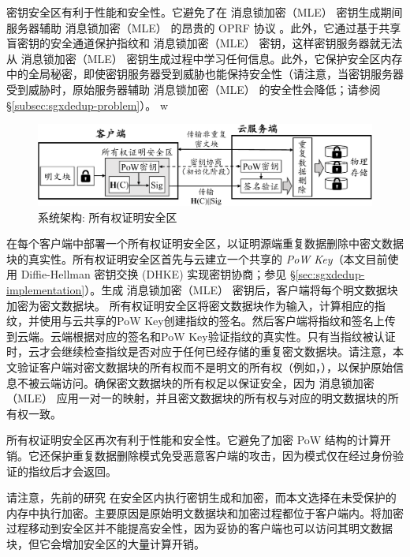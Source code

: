 密钥安全区有利于性能和安全性。它避免了在 消息锁加密（MLE） 密钥生成期间服务器辅助 消息锁加密（MLE） 的昂贵的 OPRF 协议 \cite{bellare2013DupLESS}。此外，它通过基于共享盲密钥的安全通道保护指纹和 消息锁加密（MLE） 密钥，这样密钥服务器就无法从 消息锁加密（MLE） 密钥生成过程中学习任何信息。此外，它保护安全区内存中的全局秘密，即使密钥服务器受到威胁也能保持安全性（请注意，当密钥服务器受到威胁时，原始服务器辅助 消息锁加密（MLE） 的安全性会降低；请参阅 \S\ref{subsec:sgxdedup-problem}）。
  w
\begin{figure}[!htb]
  \centering
  \includegraphics[width=\textwidth]{pic/sgxdedup/pow.pdf}
  \caption{\sysnameS 系统架构: 所有权证明安全区}
  \label{fig:sgxdedup-overview-pow}
  \vspace{-3pt}
\end{figure}

\sysnameS 在每个客户端中部署一个所有权证明安全区，以证明源端重复数据删除中密文数据块的真实性。所有权证明安全区首先与云建立一个共享的 \textit{PoW Key}（本文目前使用 Diffie-Hellman 密钥交换 (DHKE) 实现密钥协商；参见 \S\ref{sec:sgxdedup-implementation}）。生成 消息锁加密（MLE） 密钥后，客户端将每个明文数据块加密为密文数据块。 所有权证明安全区将密文数据块作为输入，计算相应的指纹，并使用与云共享的PoW Key创建指纹的签名。然后客户端将指纹和签名上传到云端。云端根据对应的签名和PoW Key验证指纹的真实性。只有当指纹被认证时，云才会继续检查指纹是否对应于任何已经存储的重复密文数据块。请注意，本文验证客户端对密文数据块的所有权而不是明文的所有权（例如，\cite{halevi11}），以保护原始信息不被云端访问。确保密文数据块的所有权足以保证安全，因为 消息锁加密（MLE） 应用一对一的映射，并且密文数据块的所有权与对应的明文数据块的所有权一致。

所有权证明安全区再次有利于性能和安全性。它避免了加密 PoW 结构的计算开销。它还保护重复数据删除模式免受恶意客户端的攻击，因为模式仅在经过身份验证的指纹后才会返回。

请注意，先前的研究 \cite{kim2019ShieldStore,fuhry20,djoko2019NEXUS} 在安全区内执行密钥生成和加密，而本文选择在未受保护的内存中执行加密。主要原因是原始明文数据块和加密过程都位于客户端内。将加密过程移动到安全区并不能提高安全性，因为妥协的客户端也可以访问其明文数据块，但它会增加安全区的大量计算开销。

